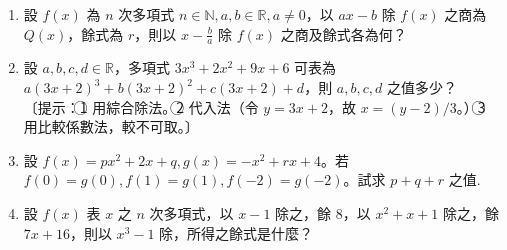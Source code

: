 \begin{enumerate}[1.]
  \item 設 $f(x)$ 為 $n$ 次多項式 $n \in \mathbb{N}, a, b \in \mathbb{R}, a \neq 0$，以 $ax-b$ 除 $f(x)$ 之商為 $Q(x)$，餘式為 $r$，則以 $x-\frac{b}{a}$ 除 $f(x)$ 之商及餘式各為何？
  \item 設 $a, b, c, d \in \mathbb{R}$，多項式 $3x^3+2x^2+9x+6$ 可表為 $a(3x+2)^3+b(3x+2)^2+c(3x+2)+d$，則 $a, b, c, d$ 之值多少？\\
  〔提示：\textcircled{1} 用綜合除法。\textcircled{2} 代入法（令 $y=3x+2$，故 $x=(y-2)/3$。）\textcircled{3} 用比較係數法，較不可取。〕
  \item 設 $f(x)=px^2+2x+q, g(x)=-x^2+rx+4$。若 $f(0)=g(0), f(1)=g(1), f(-2)=g(-2)$。試求 $p+q+r$ 之值.
  \item 設 $f(x)$ 表 $x$ 之 $n$ 次多項式，以 $x-1$ 除之，餘 $8$，以 $x^2+x+1$ 除之，餘 $7x+16$，則以 $x^3-1$ 除，所得之餘式是什麼？
\end{enumerate}
